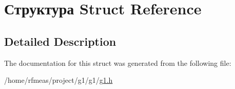 \hypertarget{struct_xD0_xA1_xD1_x82_xD1_x80_xD1_x83_xD0_xBA_xD1_x82_xD1_x83_xD1_x80_xD0_xB0}{}\section{Структура Struct Reference}
\label{struct_xD0_xA1_xD1_x82_xD1_x80_xD1_x83_xD0_xBA_xD1_x82_xD1_x83_xD1_x80_xD0_xB0}


 




\subsection{Detailed Description}


The documentation for this struct was generated from the following file\+:\begin{DoxyCompactItemize}
\item 
/home/rfmeas/project/g1/g1/\hyperlink{g1_8h}{g1.\+h}\end{DoxyCompactItemize}
